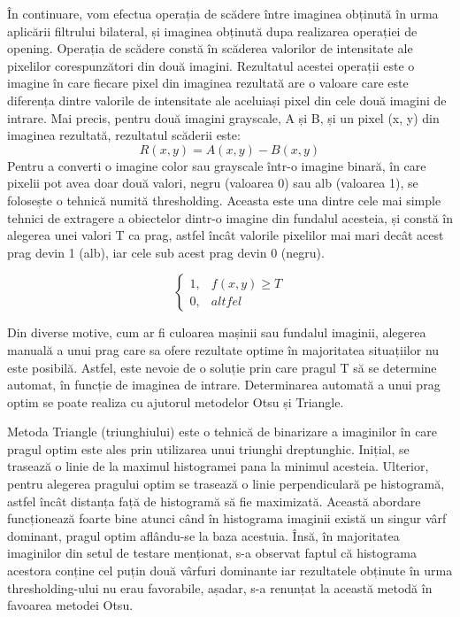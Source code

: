 \documentclass[12pt]{article}
\begin{document}
\^{I}n continuare, vom efectua operația de sc\u{a}dere \^{i}ntre imaginea obținut\u{a} \^{i}n urma aplic\u{a}rii filtrului bilateral, și imaginea obținut\u{a} dupa realizarea operației de opening. Operația de sc\u{a}dere const\u{a} \^{i}n sc\u{a}derea valorilor de intensitate ale pixelilor corespunz\u{a}tori din dou\u{a} imagini. Rezultatul acestei operații este o imagine \^{i}n care fiecare pixel din imaginea rezultat\u{a} are o valoare care este diferența dintre valorile de intensitate ale aceluiași pixel din cele două imagini de intrare.
Mai precis, pentru dou\u{a} imagini grayscale, A și B, și un pixel (x, y) din imaginea rezultat\u{a}, rezultatul sc\u{a}derii este:
\begin{equation}
    R(x, y) = A(x, y) - B(x,y)    
\end{equation}
Pentru a converti o imagine color sau grayscale \^{i}ntr-o imagine binar\u{a}, \^{i}n care pixelii pot avea doar dou\u{a} valori, negru (valoarea 0) sau alb (valoarea 1), se folosește o tehnic\u{a} numit\u{a} thresholding. Aceasta este una dintre cele mai simple tehnici de extragere a obiectelor dintr-o imagine din fundalul acesteia, și const\u{a} \^{i}n alegerea unei valori T ca prag, astfel \^{i}nc\^{a}t valorile pixelilor mai mari dec\^{a}t acest prag devin 1 (alb), iar cele sub acest prag devin 0 (negru).

\begin{equation}
\begin{cases}
1, & f(x,y) \geq T \\
0, & altfel
\end{cases}
\end{equation}

Din diverse motive, cum ar fi culoarea mașinii sau fundalul imaginii, alegerea manual\u{a} a unui prag care sa ofere rezultate optime \^{i}n majoritatea situațiilor nu este posibil\u{a}. Astfel, este nevoie de o soluție prin care pragul T s\u{a} se determine automat, \^{i}n funcție de imaginea de intrare. Determinarea automat\u{a} a unui prag optim se poate realiza cu ajutorul metodelor Otsu și Triangle.

Metoda Triangle (triunghiului) este o tehnic\u{a} de binarizare a imaginilor \^{i}n care pragul optim este ales prin utilizarea unui triunghi dreptunghic. Inițial, se traseaz\u{a} o linie de la maximul histogramei pana la minimul acesteia. Ulterior, pentru alegerea pragului optim se traseaz\u{a} o linie perpendicular\u{a} pe histogram\u{a}, astfel \^{i}nc\^{a}t distanța faț\u{a} de histogram\u{a} s\u{a} fie maximizat\u{a}. Aceast\u{a} abordare funcționeaz\u{a} foarte bine atunci c\^{a}nd \^{i}n histograma imaginii exist\u{a} un singur v\^{a}rf dominant, pragul optim afl\^{a}ndu-se la baza acestuia. \^{I}ns\u{a}, \^{i}n majoritatea imaginilor din setul de testare menționat, s-a observat faptul c\u{a} histograma acestora conține cel puțin dou\u{a} v\^{a}rfuri dominante iar rezultatele obținute \^{i}n urma thresholding-ului nu erau favorabile, așadar, s-a renunțat la aceast\u{a} metod\u{a} \^{i}n favoarea metodei Otsu.
\end{document}
